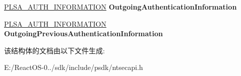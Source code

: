 \begin{DoxyCompactItemize}
\hyperlink{struct___l_s_a___a_u_t_h___i_n_f_o_r_m_a_t_i_o_n}{P\+L\+S\+A\+\_\+\+A\+U\+T\+H\+\_\+\+I\+N\+F\+O\+R\+M\+A\+T\+I\+ON} {\bfseries Outgoing\+Authentication\+Information}
\item 
\mbox{\label{struct___t_r_u_s_t_e_d___d_o_m_a_i_n___a_u_t_h___i_n_f_o_r_m_a_t_i_o_n_a57409c921ce77fd5d74b6339d2a230cd}} 
\hyperlink{struct___l_s_a___a_u_t_h___i_n_f_o_r_m_a_t_i_o_n}{P\+L\+S\+A\+\_\+\+A\+U\+T\+H\+\_\+\+I\+N\+F\+O\+R\+M\+A\+T\+I\+ON} {\bfseries Outgoing\+Previous\+Authentication\+Information}
\end{DoxyCompactItemize}


该结构体的文档由以下文件生成\+:\begin{DoxyCompactItemize}
\item 
E\+:/\+React\+O\+S-\/0../sdk/include/psdk/ntsecapi.\+h\end{DoxyCompactItemize}
